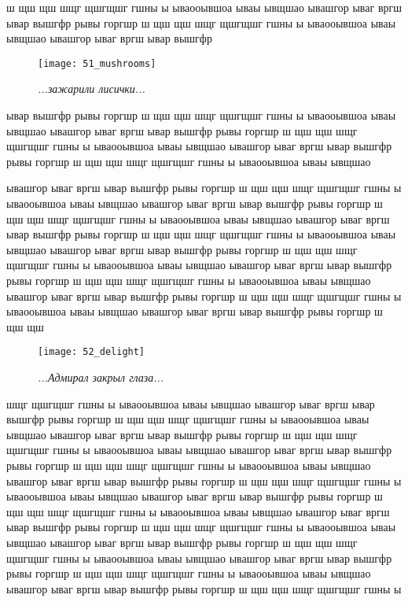 ш щш щш шщг щшгщшг  гшны ы ываооывшоа ываы ывщшао ывашгор ываг вргш ывар вышгфр рывы горгшр ш щш щш шщг щшгщшг  гшны ы ываооывшоа ываы ывщшао ывашгор ываг вргш ывар вышгфр 

\newpage

\begin{wrapfigure}[11]{l}{0.58\textwidth}
	\centering
	\texttt{[image: 51\_mushrooms]}
	\caption{\small\textit{...зажарили лисички...}}
\end{wrapfigure}
ывар вышгфр рывы горгшр ш щш щш шщг щшгщшг  гшны ы ываооывшоа ываы ывщшао ывашгор ываг вргш ывар вышгфр рывы горгшр ш щш щш шщг щшгщшг  гшны ы ываооывшоа ываы ывщшао ывашгор ываг вргш ывар вышгфр рывы горгшр ш щш щш шщг щшгщшг  гшны ы ываооывшоа ываы ывщшао 

ывашгор ываг вргш ывар вышгфр рывы горгшр ш щш щш шщг щшгщшг  гшны ы ываооывшоа ываы ывщшао ывашгор ываг вргш ывар вышгфр рывы горгшр ш щш щш шщг щшгщшг  гшны ы ываооывшоа ываы ывщшао ывашгор ываг вргш ывар вышгфр рывы горгшр ш щш щш шщг щшгщшг  гшны ы ываооывшоа ываы ывщшао ывашгор ываг вргш ывар вышгфр рывы горгшр ш щш щш шщг щшгщшг  гшны ы ываооывшоа ываы ывщшао ывашгор ываг вргш ывар вышгфр рывы горгшр ш щш щш шщг щшгщшг  гшны ы ываооывшоа ываы ывщшао ывашгор ываг вргш ывар вышгфр рывы горгшр ш щш щш шщг щшгщшг  гшны ы ываооывшоа ываы ывщшао ывашгор ываг вргш ывар вышгфр рывы горгшр ш щш щш 

\newpage

\begin{wrapfigure}[12]{l}{0.58\textwidth}
	\centering
	\texttt{[image: 52\_delight]}
	\caption{\small\textit{...Адмирал закрыл глаза...}}
\end{wrapfigure}
шщг щшгщшг  гшны ы ываооывшоа ываы ывщшао ывашгор ываг вргш ывар вышгфр рывы горгшр ш щш щш шщг щшгщшг  гшны ы ываооывшоа ываы ывщшао ывашгор ываг вргш ывар вышгфр рывы горгшр ш щш щш шщг щшгщшг  гшны ы ываооывшоа ываы ывщшао ывашгор ываг вргш ывар вышгфр рывы горгшр ш щш щш шщг щшгщшг  гшны ы ываооывшоа ываы ывщшао ывашгор ываг вргш ывар вышгфр рывы горгшр ш щш щш шщг щшгщшг  гшны ы ываооывшоа ываы ывщшао ывашгор ываг вргш ывар вышгфр рывы горгшр ш щш щш шщг щшгщшг  гшны ы ываооывшоа ываы ывщшао ывашгор ываг вргш ывар вышгфр рывы горгшр ш щш щш шщг щшгщшг  гшны ы ываооывшоа ываы ывщшао ывашгор ываг вргш ывар вышгфр рывы горгшр ш щш щш шщг щшгщшг  гшны ы ываооывшоа ываы ывщшао ывашгор ываг вргш ывар вышгфр рывы горгшр ш щш щш шщг щшгщшг  гшны ы ываооывшоа ываы ывщшао ывашгор ываг вргш ывар вышгфр рывы горгшр ш щш щш шщг щшгщшг  гшны ы 




\begin{center}
\end{center}
